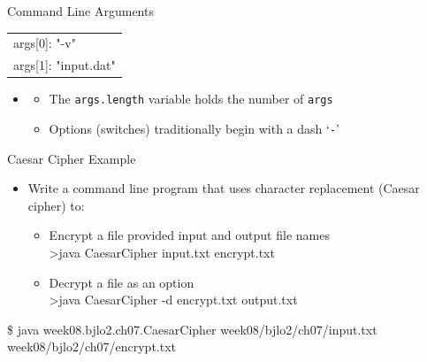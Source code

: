 \documentclass[aspectratio=43,10pt,t]{beamer}
\newcommand{\code}[1]{\texttt{#1}}
\newcommand{\shell}[1]{{\setlength{\fboxsep}{3pt}\colorbox{codebg}{\ttfamily\footnotesize #1}}}
\begin{document}
\begin{frame}{Command Line Arguments}
{{    \ttfamily\footnotesize\begin{tabular}{@{}l@{}}args[0]: "-v"\\ args[1]: "input.dat"\end{tabular}}}
  \vskip2mm
  \begin{itemize}
    \item[]
      \begin{itemize}
        \item The \code{args.length} variable holds the number of \code{args}
        \item Options (switches) traditionally begin with a dash `\code{-}'
      \end{itemize}
  \end{itemize}
\end{frame}

\begin{frame}{Caesar Cipher Example}
  \begin{itemize}
    \item Write a command line program that uses character replacement (Caesar cipher) to:
      \begin{itemize}
        \item Encrypt a file provided input and output file names\\[1mm]
              \shell{>java CaesarCipher input.txt encrypt.txt}
        \item Decrypt a file as an option\\[1mm]
              \shell{>java CaesarCipher -d encrypt.txt output.txt}
      \end{itemize}
  \end{itemize}
  \vskip5mm
  \centering
  \vskip6mm
  \raggedright
  {\ttfamily\scriptsize \$ java week08.bjlo2.ch07.CaesarCipher week08/bjlo2/ch07/input.txt week08/bjlo2/ch07/encrypt.txt}
\end{frame}
\end{document}
